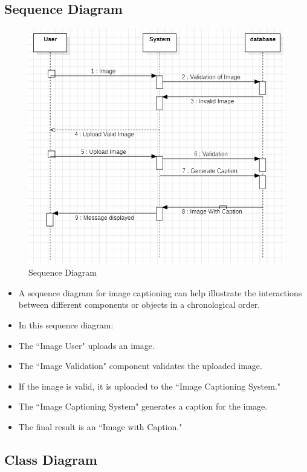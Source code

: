 \documentclass[oneside,a4paper,12pt]{report}
\begin{document}
\subsection{Sequence Diagram}
\begin{figure}[H]
\begin{center}
\includegraphics[width=1.0\linewidth]{sequence}
\caption{Sequence Diagram}
\label{Fig:f4}
\end{center}
\end{figure}
\begin{itemize}
\item A sequence diagram for image captioning can help illustrate the interactions between different components or objects in a chronological order.
\item In this sequence diagram:
\item The ``Image User" uploads an image.
\item The ``Image Validation" component validates the uploaded image.
\item If the image is valid, it is uploaded to the ``Image Captioning System."
\item The ``Image Captioning System" generates a caption for the image.
\item The final result is an ``Image with Caption."
\end{itemize}




\subsection{Class Diagram}
\end{document}
